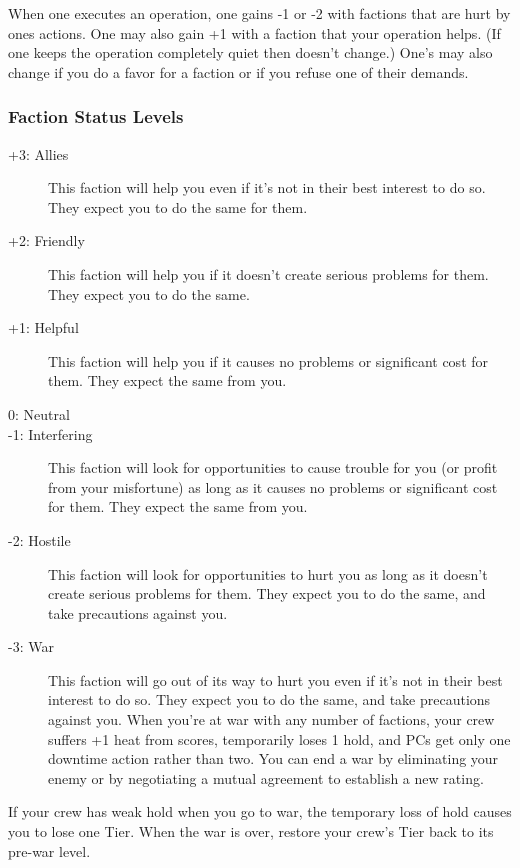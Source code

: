 When one executes an operation, one gains -1 or -2  with factions that are hurt by ones actions. One may also gain +1  with a faction that your operation helps. (If one keeps the operation completely quiet then  doesn’t change.)  One's  may also change if you do a favor for a faction or if you refuse one of their demands.

\subsubsection{Faction Status Levels}

\begin{description}
\item[+3: Allies] This faction will help you even if it’s not in their best interest to do so. They expect you to do the same for them.
\item[+2: Friendly] This faction will help you if it doesn’t create serious problems for them. They expect you to do the same.
\item[+1: Helpful] This faction will help you if it causes no problems or significant cost for them. They expect the same from you.
\item[0: Neutral]
\item[-1: Interfering] This faction will look for opportunities to cause trouble for you (or profit from your misfortune) as long as it causes no problems or significant cost for them. They expect the same from you.
\item[-2: Hostile] This faction will look for opportunities to hurt you as long as it doesn’t create serious problems for them. They expect you to do the same, and take precautions against you.
\item[-3: War] This faction will go out of its way to hurt you even if it’s not in their best interest to do so. They expect you to do the same, and take precautions against you. When you’re at war with any number of factions, your crew suffers +1 heat from scores, temporarily loses 1 hold, and PCs get only one downtime action rather than two. You can end a war by eliminating your enemy or by negotiating a mutual agreement to establish a new  rating.
\end{description}

\begin{qb}If your crew has weak hold when you go to war, the temporary loss of hold causes you to lose one Tier. When the war is over, restore your crew’s Tier back to its pre-war level.\end{qb}

